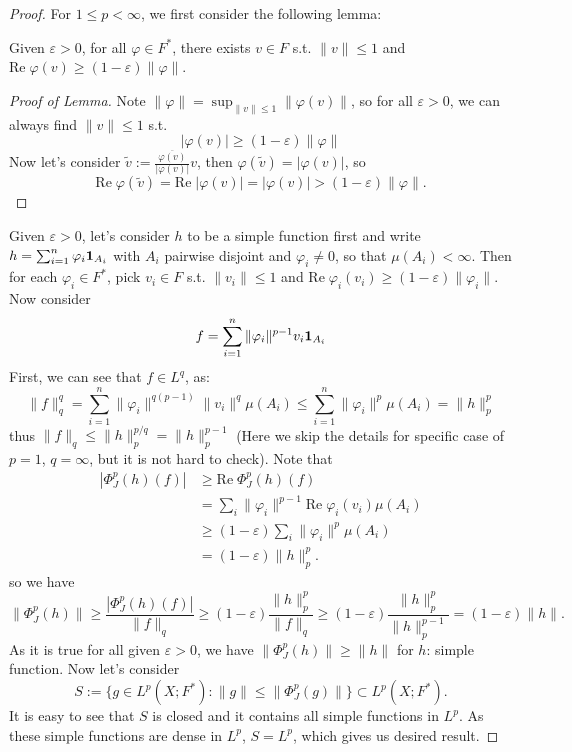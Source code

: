 \begin{proof}
For $1\leq p <\infty$, we first consider the following lemma:
\begin{lemma}
Given $\varepsilon>0$, for all $\varphi\in F^*$, there exists $v\in F$ s.t. $\|v\|\leq 1$ and 
$\text{Re}\;\varphi(v)\geq (1-\varepsilon)\|\varphi\|$.
\end{lemma}
\begin{proof}[Proof of Lemma]
Note $\|\varphi\|=\sup_{\|v\|\leq 1}\|\varphi(v)\|$, so for all $\varepsilon>0$, we can always find $\|v\|\leq 1$ s.t.
\begin{equation*}
    |\varphi(v)|\geq (1-\varepsilon)\|\varphi\|
\end{equation*}
Now let's consider $\tilde{v}:=\frac{\overline{\varphi(v)}}{|\varphi(v)|}v$, then $\varphi(\tilde{v})=|\varphi(v)|$, so
\begin{equation*}
    \text{Re}\;\varphi(\tilde{v})=\text{Re}\;|\varphi(v)|=|\varphi(v)|>(1-\varepsilon)\|\varphi\|.
\end{equation*}
\end{proof}
Given $\varepsilon>0$, let's consider $h$ to be a simple function first and write $h=\sum_{i=1}^n \varphi_i \mathbf{1}_{A_i}$ with $A_i$ pairwise disjoint and $\varphi_i\neq 0$, so that $\mu(A_i)<\infty$.
Then for each $\varphi_i\in F^*$, pick $v_i\in F$ s.t. $\|v_i\|\leq 1$ and 
$\text{Re}\;\varphi_i(v_i)\geq (1-\varepsilon)\|\varphi_i\|$. Now consider 
\begin{equation*}
    f=\sum_{i=1}^n \|\varphi_i\|^{p-1}v_i \mathbf{1}_{A_i}
\end{equation*}
First, we can see that $f\in L^q$, as:
\begin{equation*}
    \|f\|_q^q=\sum_{i=1}^n\|\varphi_i\|^{q(p-1)}\|v_i\|^q \mu(A_i)\leq \sum_{i=1}^n\|\varphi_i\|^p \mu(A_i)=\|h\|_p^p
\end{equation*}
thus $\|f\|_q \leq \|h\|_p^{p/q}=\|h\|_p^{p-1}$ (Here we skip the details for specific case of 
$p=1$, $q=\infty$, but it is not hard to check). Note that 
\begin{align*}
    |\Phi_J^p(h)(f)|&\geq \text{Re}\; \Phi_J^p(h)(f)\\
      &= \sum_i \|\varphi_i\|^{p-1}\text{Re}\;\varphi_i(v_i)\mu(A_i)\\
      &\geq (1-\varepsilon)\sum_i \|\varphi_i\|^p \mu(A_i)\\
      &= (1-\varepsilon)\|h\|_p^p.
\end{align*}
so we have
\begin{equation*}
    \|\Phi_J^p(h)\|\geq \frac{|\Phi_J^p(h)(f)|}{\|f\|_q}\geq (1-\varepsilon)\frac{\|h\|_p^p}{\|f\|_q}\geq (1-\varepsilon)\frac{\|h\|_p^p}{\|h\|_p^{p-1}}=(1-\varepsilon)\|h\|.
\end{equation*}
As it is true for all given $\varepsilon>0$, we have $\|\Phi_J^p(h)\|\geq \|h\|$ for $h$: simple function. Now let's consider
\begin{equation*}
    S:=\{g\in L^p(X;F^*):\|g\|\leq \|\Phi_J^p(g)\|\}\subset L^p(X;F^*).
\end{equation*}
It is easy to see that $S$ is closed and it contains all simple functions in $L^p$. As these simple functions are dense in 
$L^p$, $S=L^p$, which gives us desired result.


\end{proof}
